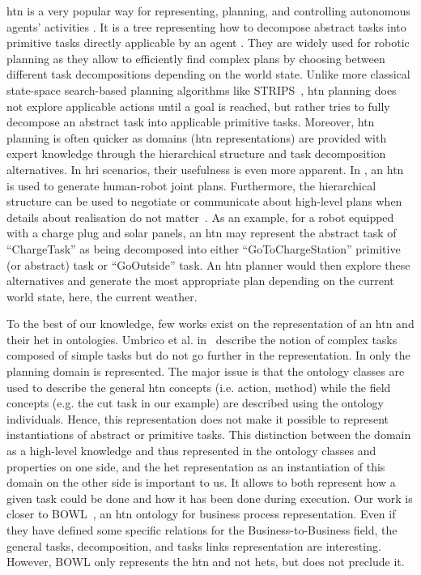 \acrshort{htn} is a very popular way for representing, planning, and controlling autonomous agents' activities \cite{ghallab_2004_automated, ingrand_2017_deliberation}. It is a tree representing how to decompose abstract tasks into primitive tasks directly applicable by an agent \cite{erol_1994_htn}. They are widely used for robotic planning as they allow to efficiently find complex plans by choosing between different task decompositions depending on the world state. 
Unlike more classical state-space search-based planning algorithms like STRIPS~\cite{fikes_1971_strips}, \acrshort{htn} planning does not explore applicable actions until a goal is reached, but rather tries to fully decompose an abstract task into applicable primitive tasks. Moreover, \acrshort{htn} planning is often quicker as domains (\acrshort{htn} representations) are provided with expert knowledge through the hierarchical structure and task decomposition alternatives. 
In \acrshort{hri} scenarios, their usefulness is even more apparent. In \cite{lallement_2014_hatp}, an \acrshort{htn} is used to generate human-robot joint plans. Furthermore, the hierarchical structure can be used to negotiate or communicate about high-level plans when details about realisation do not matter~\cite{milliez_2016_using}. As an example, for a robot equipped with a charge plug and solar panels, an \acrshort{htn} may represent the abstract task of ``ChargeTask'' as being decomposed into either ``GoToChargeStation'' primitive (or abstract) task or ``GoOutside'' task. An \acrshort{htn} planner would then explore these alternatives and generate the most appropriate plan depending on the current world state, here, the current weather.

To the best of our knowledge, few works exist on the representation of an \acrshort{htn} and their \acrfull{het} in ontologies. Umbrico et al. in~\cite{umbrico_2020_ontology} describe the notion of complex tasks composed of simple tasks but do not go further in the representation. In \cite{freitas_2014_using} only the planning domain is represented. The major issue is that the ontology classes are used to describe the general \acrshort{htn} concepts (i.e. action, method) while the field concepts (e.g. the cut task in our example) are described using the ontology individuals. Hence, this representation does not make it possible to represent instantiations of abstract or primitive tasks. This distinction between the domain as a high-level knowledge and thus represented in the ontology classes and properties on one side, and the \acrshort{het} representation as an instantiation of this domain on the other side is important to us. It allows to both represent how a given task could be done and how it has been done during execution. Our work is closer to BOWL~\cite{ko_2011_business}, an \acrshort{htn} ontology for business process representation. Even if they have defined some specific relations for the Business-to-Business field, the general tasks, decomposition, and tasks links representation are interesting. However, BOWL only represents the \acrshort{htn} and not \acrshort{het}s, but does not preclude it.


